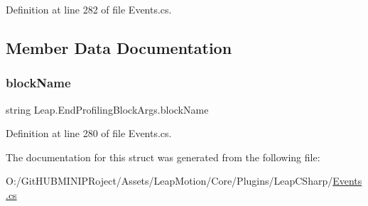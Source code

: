 Definition at line 282 of file Events.\+cs.



\subsection{Member Data Documentation}
\mbox{\label{struct_leap_1_1_end_profiling_block_args_a5bc05bde6a49a20b69ca4d199f368b67}} 
\subsubsection{\texorpdfstring{blockName}{blockName}}
{\footnotesize\ttfamily string Leap.\+End\+Profiling\+Block\+Args.\+block\+Name}



Definition at line 280 of file Events.\+cs.



The documentation for this struct was generated from the following file\+:\begin{DoxyCompactItemize}
\item 
O\+:/\+Git\+H\+U\+B\+M\+I\+N\+I\+P\+Roject/\+Assets/\+Leap\+Motion/\+Core/\+Plugins/\+Leap\+C\+Sharp/\mbox{\hyperlink{_events_8cs}{Events.\+cs}}\end{DoxyCompactItemize}
